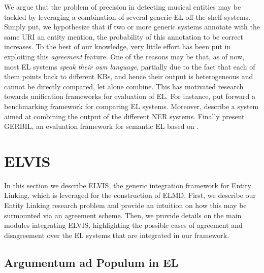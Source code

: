 We argue that the problem of precision in detecting musical entities may be tackled by leveraging a combination of several generic EL off-the-shelf systems. Simply put, we hypothesize that if two or more generic systems annotate with the same URI an entity mention, the probability of this annotation to be correct increases. To the best of our knowledge, very little effort has been put in exploiting this \textit{agreement} feature. One of the reasons may be that, as of now, most EL systems \textit{speak their own language}, partially due to the fact that each of them points back to different KBs, and hence their output is heterogeneous and cannot be directly compared, let alone combine. This has motivated research towards unification frameworks for evaluation of EL. For instance, \cite{Cornolti2013} put forward a benchmarking framework for comparing EL systems. Moreover, \cite{Rizzo2014} describe a system aimed at combining the output of the different NER systems. Finally \cite{Usbeck2015} present \textsc{GERBIL}, an evaluation framework for semantic EL based on \cite{Cornolti2013}. %



\section{ELVIS}
\label{sec:method}

In this section we describe \textsc{ELVIS}, the generic integration framework for Entity Linking, which is leveraged for the construction of \textsc{ELMD}. First, we describe our Entity Linking research problem and provide an intuition on how this may be surmounted via an agreement scheme. Then, we provide details on the main modules integrating \textsc{ELVIS}, highlighting the possible cases of agreement and disagreement over the EL systems that are integrated in our framework.

\subsection{Argumentum ad Populum in EL}
\label{sec:tools}


